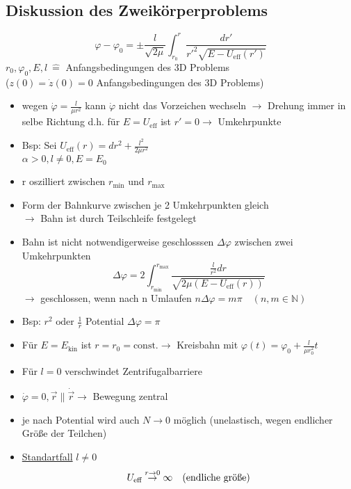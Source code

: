 \documentclass[titlepage,12pt,a4paper,ngerman]{report}
\newcommand{\tx}[1]{\textrm{#1}}
\begin{document}
{\subsection{Diskussion des Zweikörperproblems}
$$\varphi - \varphi_0 = \pm \frac{l}{\sqrt{2 \mu}} \int_{r_0}^{r} \frac{dr'}{r'^2 \sqrt{E - U_{\tx{eff}} (r')}}$$
$ r_0, \varphi_0, E, l \  \widehat{=} $ Anfangsbedingungen des 3D Problems\\
($ z(0) = \dot{z}(0)  = 0 $ Anfangsbedingungen des 3D Problems)
\begin{itemize}
	\item wegen $ \dot{\varphi} = \frac{l}{\mu r^2} $ kann $ \dot{\varphi} $ nicht das Vorzeichen wechseln $ \rightarrow $ Drehung immer in selbe Richtung d.h. für $  E = U_{\tx{eff}} $ ist $ r' = 0  \rightarrow $ Umkehrpunkte
	\item Bsp: Sei $ U_{\tx{eff}} (r) = dr^2 + \frac{l^2}{2 \mu r^2}$ \\
	$\alpha > 0 , l \neq 0, E = E_0$
	\item  r oszilliert zwischen $ r_{\tx{min}} $ und $ r_{\tx{max}} $ 
	\item Form der Bahnkurve zwischen je 2 Umkehrpunkten gleich\\
	$ \rightarrow $ Bahn ist durch Teilschleife festgelegt
	\item  Bahn ist nicht notwendigerweise geschlosssen $ \Delta \varphi $ zwischen zwei Umkehrpunkten 
	$$\Delta \varphi = 2 \int_{r_{\tx{min}}}^{r_{\tx{max}}} \frac{\frac{l}{r^2} dr}{\sqrt{ 2\mu (E-U_{\tx{eff}}(r))}}$$
	$ \rightarrow $ geschlossen, wenn nach n Umlaufen $ n \Delta \varphi = m \pi \quad (n,m \in \mathbb{N}) $
	\item Bsp: $ r^2  \tx{ oder } \frac{1}{r}$ Potential $ \Delta \varphi = \pi $\\
	\item  Für $ E = E_{\tx{kin}} $ ist $ r = r_0 = \tx{const.} \rightarrow$ Kreisbahn mit $ \varphi(t)  = \varphi_0 + \frac{l}{\mu r^2_0} t $ 
	\item Für $ l = 0 $ verschwindet Zentrifugalbarriere
	\item $ \dot{\varphi} = 0 , \vec{r} \parallel \dot{\vec{r}} \rightarrow $ Bewegung zentral
	\item  je nach Potential wird auch $ N \rightarrow 0 $ möglich (unelastisch, wegen endlicher Größe der Teilchen)
	\item \underline{Standartfall} $ l \neq 0 $\\
	$$\begin{array}{ll}
	U_{\tx{eff}} \buildrel r \rightarrow 0 \over \rightarrow \infty & \tx{(endliche größe)} \\

\end{array}$$
\end{itemize}}
\end{document}
